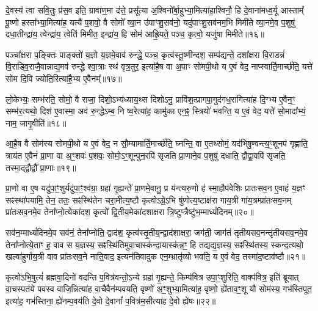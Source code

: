 {\anuvakamend[{वा॒चो हव॑म॒भिघृ॑तानां गृह्णात्यु॒त पञ्च॑विꣳशतिश्च॥३॥}]}

दे॒वस्य॑ त्वा सवि॒तुः प्र॑स॒व इति॒ ग्रावा॑ण॒मा द॑त्ते॒ प्रसू᳚त्या अ॒श्विनो᳚र्बा॒हुभ्या॒मित्या॑हा॒श्विनौ॒ हि दे॒वाना॑मध्व॒र्यू आस्ताम्᳚ पू॒ष्णो हस्ता᳚भ्या॒मित्या॑ह॒ यत्यै॑ प॒शवो॒ वै सोमो᳚ व्या॒न उ॑पाꣳशु॒सव॑नो॒ यदु॑पाꣳशु॒सव॑नम॒भि मिमी॑ते व्या॒नमे॒व प॒शुषु॑ दधा॒तीन्द्रा॑य॒ त्वेन्द्रा॑य॒ त्वेति॑ मिमीत॒ इन्द्रा॑य॒ हि सोम॑ आह्रि॒यते॒ पञ्च॒ कृत्वो॒ यजु॑षा मिमीते॥१६॥

पञ्चा᳚क्षरा प॒ङ्क्तिः पाङ्क्तो॑ य॒ज्ञो य॒ज्ञमे॒वाव॑ रुन्द्धे॒ पञ्च॒ कृत्व॑स्तू॒ष्णीन्दश॒ सम्प॑द्यन्ते॒ दशा᳚क्षरा वि॒राडन्नं॑ वि॒राड्वि॒राजै॒वान्नाद्य॒मव॑ रुन्द्धे श्वा॒त्राः स्थ॑ वृत्र॒तुर॒ इत्या॑है॒ष वा अ॒पाꣳ सो॑मपी॒थो य ए॒वं वेद॒ नाप्स्वार्ति॒मार्च्छ॑ति॒ यत्ते॑ सोम दि॒वि ज्योति॒रित्या॑है॒भ्य ए॒वैनम्᳚॥१७॥

लो॒केभ्यः॒ सम्भ॑रति॒ सोमो॒ वै राजा॒ दिशो॒\-ऽभ्य॑ध्याय॒थ्स दिशो\-ऽनु॒ प्रावि॑श॒त्प्रागपा॒गुद॑गध॒रागित्या॑ह दि॒ग्भ्य ए॒वैन॒ꣳ॒ सम्भ॑र॒त्यथो॒ दिश॑ ए॒वास्मा॒ अव॑ रु॒न्द्धे\-ऽम्ब॒ नि ष्व॒रेत्या॑ह॒ कामु॑का एन॒ꣴ॒ स्त्रियो॑ भवन्ति॒ य ए॒वं वेद॒ यत्ते॑ सो॒मादा᳚भ्यं॒ नाम॒ जागृ॒वीति॑॥१८॥

आ॒है॒ष वै सोम॑स्य सोमपी॒थो य ए॒वं वेद॒ न सौ॒म्यामार्ति॒मार्च्छ॑ति॒ घ्नन्ति॒ वा ए॒तथ्सोमं॒ यद॑भिषु॒ण्वन्त्य॒ꣳ॒शूनप॑ गृह्णाति॒ त्राय॑त ए॒वैनं॑ प्रा॒णा वा अ॒ꣳ॒शवः॑ प॒शवः॒ सोमो॒\-ऽꣳ॒शून्पुन॒रपि॑ सृजति प्रा॒णाने॒व प॒शुषु॑ दधाति॒ द्वौद्वा॒वपि॑ सृजति॒ तस्मा॒द्द्वौद्वौ᳚ प्रा॒णाः॥१९॥

{\anuvakamend[{यजु॑षा मिमीत एनं॒ जागृ॒वीति॒ चतु॑श्चत्वारिꣳशच्च॥४॥}]}

प्रा॒णो वा ए॒ष यदु॑पा॒ꣳ॒शुर्यदु॑पा॒ꣳ॒श्व॑ग्रा॒ ग्रहा॑ गृ॒ह्यन्ते᳚ प्रा॒णमे॒वानु॒ प्र य॑न्त्यरु॒णो ह॑ स्मा॒हौप॑वेशिः प्रातःसव॒न ए॒वाहं य॒ज्ञꣳ सꣴस्था॑पयामि॒ तेन॒ ततः॒ सꣴस्थि॑तेन चरा॒मीत्य॒ष्टौ कृत्वो\-ऽग्रे॒\-ऽभि षु॑णोत्य॒ष्टाक्ष॑रा गाय॒त्री गा॑य॒त्रम्प्रा॑तःसव॒नम् प्रा॑तःसव॒नमे॒व तेना᳚प्नो॒त्येका॑दश॒ कृत्वो᳚ द्वि॒तीय॒मेका॑दशाक्षरा त्रि॒ष्टुप्त्रैष्टु॑भ॒म्माध्यं॑दिनम्॥२०॥

सव॑न॒म्माध्यं॑दिनमे॒व सव॑नं॒ तेना᳚प्नोति॒ द्वाद॑श॒ कृत्व॑स्तृ॒तीय॒न्द्वाद॑शाक्षरा॒ जग॑ती॒ जाग॑तं तृतीयसव॒नन्तृ॑तीयसव॒नमे॒व तेना᳚प्नोत्ये॒ताꣳ ह॒ वाव स य॒ज्ञस्य॒ सꣴस्थि॑तिमुवा॒चास्क॑न्दा॒यास्क॑न्न॒ꣳ॒ हि तद्यद्य॒ज्ञस्य॒ सꣴस्थि॑तस्य॒ स्कन्द॒त्यथो॒ खल्वा॑हुर्गाय॒त्री वाव प्रा॑तःसव॒ने नाति॒वाद॒ इत्यन॑तिवादुक एन॒म्भ्रातृ॑व्यो भवति॒ य ए॒वं वेद॒ तस्मा॑द॒ष्टाव॑ष्टौ॥२१॥

कृत्वो॑\-ऽभि॒षुत्यं॑ ब्रह्मवा॒दिनो॑ वदन्ति प॒वित्र॑वन्तो॒\-ऽन्ये ग्रहा॑ गृ॒ह्यन्ते॒ किम्प॑वित्र उपा॒ꣳ॒शुरिति॒ वाक्प॑वित्र॒ इति॑ ब्रूयात् वा॒चस्पत॑ये पवस्व वाजि॒न्नित्या॑ह वा॒चैवैन॑म्पवयति॒ वृष्णो॑ अ॒ꣳ॒शुभ्या॒मित्या॑ह॒ वृष्णो॒ ह्ये॑ताव॒ꣳ॒शू यौ सोम॑स्य॒ गभ॑स्तिपूत॒ इत्या॑ह॒ गभ॑स्तिना॒ ह्ये॑नम्प॒वय॑ति दे॒वो दे॒वानां᳚ प॒वित्र॑म॒सीत्या॑ह दे॒वो ह्ये॑षः॥२२॥

